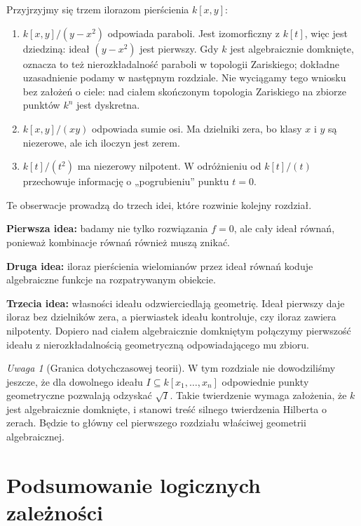 \documentclass[11pt,a4paper,openany]{report}
\numberwithin{equation}{section}
\theoremstyle{plain}
\theoremstyle{definition}
\theoremstyle{remark}
\newtheorem{uwaga}[twierdzenie]{Uwaga}
\begin{document}
Przyjrzyjmy się trzem ilorazom pierścienia $k[x,y]$:
\begin{enumerate}[label=\arabic*)]
\item $k[x,y]/(y-x^2)$ odpowiada paraboli. Jest izomorficzny z $k[t]$,
więc jest dziedziną: ideał $(y-x^2)$ jest pierwszy.
Gdy $k$ jest algebraicznie domknięte, oznacza to też
nierozkładalność paraboli w topologii Zariskiego; dokładne uzasadnienie
podamy w następnym rozdziale. Nie wyciągamy tego wniosku bez założeń
o ciele: nad ciałem skończonym topologia Zariskiego na zbiorze
punktów $k^n$ jest dyskretna.
\item $k[x,y]/(xy)$ odpowiada sumie osi. Ma dzielniki zera,
bo klasy $x$ i $y$ są niezerowe, ale ich iloczyn jest zerem.
\item $k[t]/(t^2)$ ma niezerowy nilpotent. W odróżnieniu od
$k[t]/(t)$ przechowuje informację o „pogrubieniu” punktu $t=0$.
\end{enumerate}
Te obserwacje prowadzą do trzech idei, które rozwinie kolejny rozdział.

\textbf{Pierwsza idea:} badamy nie tylko rozwiązania $f=0$, ale cały
ideał równań, ponieważ kombinacje równań również muszą znikać.

\textbf{Druga idea:} iloraz pierścienia wielomianów przez ideał równań
koduje algebraiczne funkcje na rozpatrywanym obiekcie.

\textbf{Trzecia idea:} własności ideału odzwierciedlają geometrię.
Ideał pierwszy daje iloraz bez dzielników zera,
a pierwiastek ideału kontroluje, czy iloraz zawiera nilpotenty.
Dopiero nad ciałem algebraicznie domkniętym połączymy pierwszość
ideału z nierozkładalnością geometryczną odpowiadającego mu zbioru.

\begin{uwaga}[Granica dotychczasowej teorii]
W tym rozdziale nie dowodziliśmy jeszcze, że dla dowolnego ideału
$I\subseteq k[x_1,\dots,x_n]$ odpowiednie punkty geometryczne
pozwalają odzyskać $\sqrt I$. Takie twierdzenie wymaga
założenia, że $k$ jest algebraicznie domknięte, i stanowi treść
silnego twierdzenia Hilberta o zerach. Będzie to główny cel
pierwszego rozdziału właściwej geometrii algebraicznej.
\end{uwaga}

\section{Podsumowanie logicznych zależności}
\end{document}
